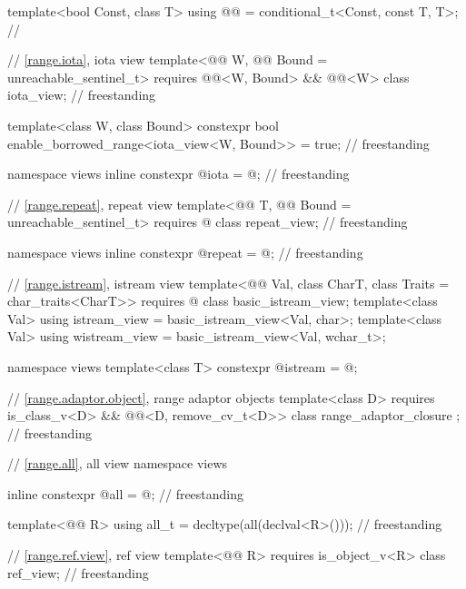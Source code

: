 \begin{codeblock}
{  template<bool Const, class T>
    using @@ = conditional_t<Const, const T, T>;   // \expos

  // \ref{range.iota}, iota view
  template<@@ W, @@ Bound = unreachable_sentinel_t>
    requires @@<W, Bound> && @@<W>
  class iota_view;                                                                  // freestanding

  template<class W, class Bound>
    constexpr bool enable_borrowed_range<iota_view<W, Bound>> = true;               // freestanding

  namespace views { inline constexpr @\unspecnc@ iota = @\unspecnc@; }              // freestanding

  // \ref{range.repeat}, repeat view
  template<@@ T, @@ Bound = unreachable_sentinel_t>
    requires @\seebelow@
  class repeat_view;                                                                // freestanding

  namespace views { inline constexpr @\unspecnc@ repeat = @\unspecnc@; }            // freestanding

  // \ref{range.istream}, istream view
  template<@@ Val, class CharT, class Traits = char_traits<CharT>>
    requires @\seebelow@
  class basic_istream_view;
  template<class Val>
    using istream_view = basic_istream_view<Val, char>;
  template<class Val>
    using wistream_view = basic_istream_view<Val, wchar_t>;

  namespace views { template<class T> constexpr @\unspecnc@ istream = @\unspecnc@; }

  // \ref{range.adaptor.object}, range adaptor objects
  template<class D>
    requires is_class_v<D> && @@<D, remove_cv_t<D>>
  class range_adaptor_closure { };                                                  // freestanding

  // \ref{range.all}, all view
  namespace views {
    inline constexpr @\unspecnc@ all = @\unspecnc@;                                 // freestanding

    template<@@ R>
      using all_t = decltype(all(declval<R>()));                                    // freestanding
  }

  // \ref{range.ref.view}, ref view
  template<@@ R>
    requires is_object_v<R>
  class ref_view;                                                                   // freestanding

}
\end{codeblock}
